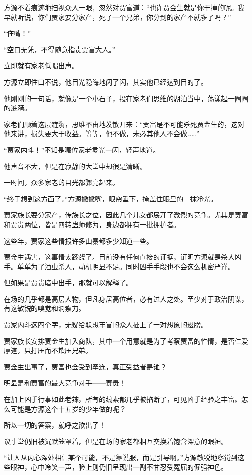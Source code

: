 \begin{this_body}
方源不着痕迹地扫视众人一眼，忽然对贾富道：“也许贾金生就是你干掉的呢。我早就听说，你们贾家要分家产，死了一个兄弟，你分到的家产不就多了吗？”

“住嘴！”

“空口无凭，不得随意指责贾富大人。”

立即就有家老低喝出声。

方源立即住口不说，他目光隐晦地闪了闪，其实他已经达到目的了。

他刚刚的一句话，就像是一个小石子，投在家老们思维的湖泊当中，荡漾起一圈圈的涟漪。

家老们顺着这层涟漪，思维不由地发散开来：“贾富是不可能杀死贾金生的，这对他来讲，损失要大于收益。等等，他不做，未必其他人不会做……”

“贾家内斗！”不知是哪位家老灵光一闪，轻声地道。

他声音不大，但是在寂静的大堂中却很是清晰。

一时间，众多家老的目光都骤亮起来。

“终于想到这方面了。”方源撇撇嘴，眼帘垂下，掩盖住眼里的一抹冷光。

贾家族长要分家产，传族长之位，因此几个儿女都展开了激烈的竞争。尤其是贾富和贾贵两位，皆是四转蛊师修为，身边都拥有一批拥护者。

这些年，贾家这些情报许多山寨都多少知道一些。

贾金生遇害，这事情太蹊跷了。目前没有任何直接的证据，证明方源就是杀人凶手。单单为了酒虫杀人，动机明显不足。同时凶手手段也不会这么机密严谨。

但如果是贾贵暗中出手，那就可以解释了。

在场的几乎都是高层人物，但凡身居高位者，必有过人之处。至少对于政治阴谋，有这敏锐的嗅觉和洞察力。

贾家内斗这四个字，无疑给联想丰富的众人插上了一对想象的翅膀。

贾家族长安排贾金生加入商队，其中一个用意就是为了考察贾富的性情，是否仁爱厚道，只打压而不欺压兄弟。

贾金生出事了，贾富也会受到牵连，真正受益者是谁？

明显是和贾富的最大竞争对手——贾贵！

在加上凶手行事如此老辣，所有的线索都几乎被掐断了，可见凶手经验之丰富。怎么可能是方源这个十五岁的少年做的呢？

所以一切的答案，就呼之欲出了！

议事堂仍旧被沉默笼罩着，但是在场的家老都相互交换着饱含深意的眼神。

“让人从内心深处相信某个可能，不是靠说服，而是引导啊。”方源敏锐地察觉到这些眼神，心中冷笑一声，脸上则仍旧呈现出一副不甘忍受冤屈的倔强神色。


\end{this_body}

